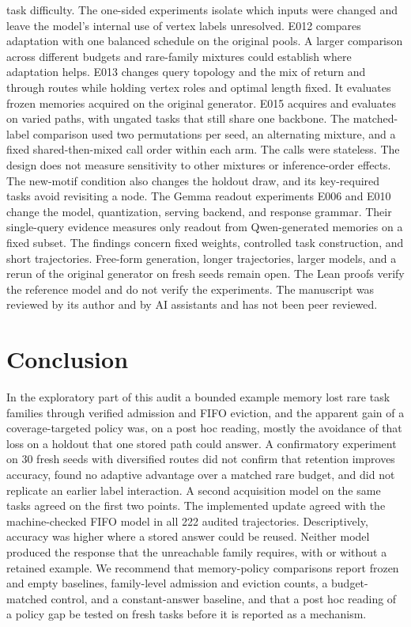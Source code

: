 \documentclass[11pt]{article}
\begin{document}
task difficulty. The one-sided experiments isolate which inputs were
changed and leave
the model's internal use of vertex labels unresolved. E012 compares
adaptation with one balanced schedule on the original pools. A larger
comparison across different budgets and rare-family mixtures could
establish where adaptation helps. E013 changes query topology and
the mix of return and through routes while holding vertex roles and
optimal length fixed. It evaluates frozen memories acquired on the
original generator. E015 acquires and evaluates on varied paths, with
ungated tasks that still share one backbone.
The matched-label comparison used two permutations per seed, an
alternating mixture, and a fixed shared-then-mixed call order within
each arm. The calls were stateless. The design does not measure
sensitivity to other mixtures or inference-order effects. The new-motif
condition also changes
the holdout draw, and its key-required tasks avoid revisiting a node.
The Gemma readout experiments E006 and E010 change the model,
quantization, serving backend, and response grammar. Their
single-query evidence measures only readout from Qwen-generated
memories on a fixed subset. The findings concern
fixed weights, controlled task construction, and short trajectories.
Free-form generation, longer trajectories, larger models, and a rerun
of the original generator on fresh seeds remain open. The Lean proofs
verify the reference model and do not verify the experiments. The
manuscript was reviewed by its author and by AI assistants and has not
been peer reviewed.

\section{Conclusion}

In the exploratory part of this audit a bounded example memory lost
rare task families through verified admission and FIFO eviction, and
the apparent gain of a coverage-targeted policy was, on a post hoc
reading, mostly the avoidance of that loss on a holdout that one stored path could answer.
A confirmatory experiment on 30 fresh seeds with diversified routes did
not confirm that retention improves accuracy, found no adaptive
advantage over a matched rare budget, and did not replicate an earlier
label interaction. A second acquisition model on the same tasks agreed
on the first two points. The implemented update agreed with the
machine-checked FIFO model in
all 222 audited trajectories. Descriptively, accuracy was higher
where a stored answer could be reused. Neither model produced the
response that the unreachable family requires, with or without a
retained example. We recommend that memory-policy
comparisons report frozen and empty baselines, family-level admission
and eviction counts, a budget-matched control, and a constant-answer
baseline, and that a post hoc reading of a policy gap be tested on
fresh tasks before it is reported as a mechanism.
\end{document}
